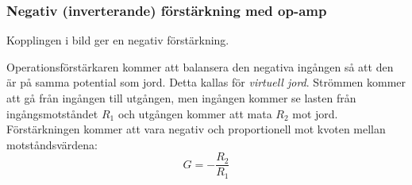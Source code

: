 \subsubsection{Negativ (inverterande) förstärkning med op-amp}
\label{inverterande förstärkning}
\label{virtuell jord}
\label{jordning!virtuell}

Kopplingen i bild  ger en negativ förstärkning.


Operationsförstärkaren kommer att balansera den negativa ingången så att den
är på samma potential som jord.
Detta kallas för \emph{virtuell jord}.
Strömmen kommer att gå från ingången till utgången, men ingången kommer se
lasten från ingångsmotståndet \(R_1\) och utgången kommer att mata \(R_2\) mot
jord.
Förstärkningen kommer att vara negativ och proportionell mot kvoten mellan
motståndsvärdena:
\[G = -\dfrac{R_2}{R_1}\]

